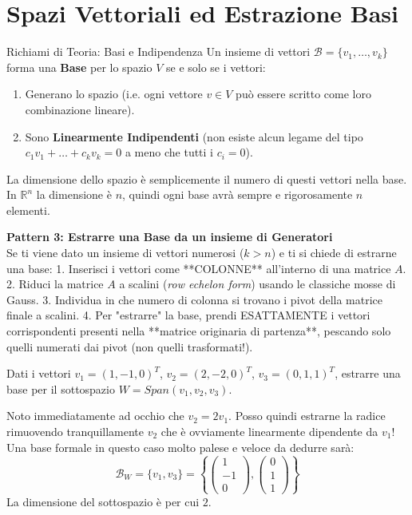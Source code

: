 \section{Spazi Vettoriali ed Estrazione Basi}

\begin{concept}{Richiami di Teoria: Basi e Indipendenza}
Un insieme di vettori $\mathcal{B} = \{v_1, \dots, v_k\}$ forma una \textbf{Base} per lo spazio $V$ se e solo se i vettori:
\begin{enumerate}
    \item Generano lo spazio (i.e. ogni vettore $v \in V$ può essere scritto come loro combinazione lineare).
    \item Sono \textbf{Linearmente Indipendenti} (non esiste alcun legame del tipo $c_1 v_1 + \dots + c_k v_k = 0$ a meno che tutti i $c_i=0$).
\end{enumerate}
La dimensione dello spazio è semplicemente il numero di questi vettori nella base. In $\mathbb{R}^n$ la dimensione è $n$, quindi ogni base avrà sempre e rigorosamente $n$ elementi.
\end{concept}

\begin{logicbox}
\textbf{Pattern 3: Estrarre una Base da un insieme di Generatori}\\
Se ti viene dato un insieme di vettori numerosi ($k > n$) e ti si chiede di estrarne una base:
1. Inserisci i vettori come **COLONNE** all'interno di una matrice $A$.
2. Riduci la matrice $A$ a scalini (\textit{row echelon form}) usando le classiche mosse di Gauss.
3. Individua in che numero di colonna si trovano i pivot della matrice finale a scalini.
4. Per "estrarre" la base, prendi ESATTAMENTE i vettori corrispondenti presenti nella **matrice originaria di partenza**, pescando solo quelli numerati dai pivot (non quelli trasformati!).
\end{logicbox}

\begin{exercisebox}[title={Esercizio 1: Estrazione}]
Dati i vettori $v_1=(1,-1,0)^T$, $v_2=(2,-2,0)^T$, $v_3=(0,1,1)^T$, estrarre una base per il sottospazio $W = Span(v_1, v_2, v_3)$.
\end{exercisebox}

\begin{solbox}
Noto immediatamente ad occhio che $v_2 = 2v_1$.
Posso quindi estrarne la radice rimuovendo tranquillamente $v_2$ che è ovviamente linearmente dipendente da $v_1$!
Una base formale in questo caso molto palese e veloce da dedurre sarà:
$$ \mathcal{B}_W = \{ v_1, v_3 \} = \left\{ \begin{pmatrix} 1 \\ -1 \\ 0 \end{pmatrix}, \begin{pmatrix} 0 \\ 1 \\ 1 \end{pmatrix} \right\} $$
La dimensione del sottospazio è per cui $2$.
\end{solbox}

